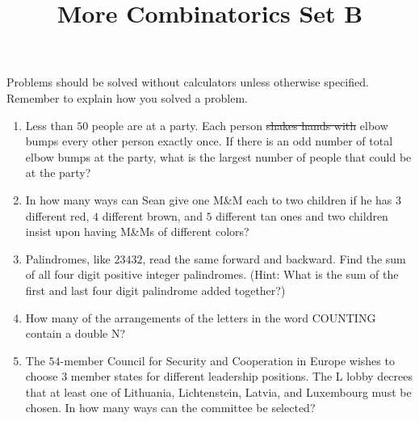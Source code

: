 \documentclass{article}
\title{More Combinatorics Set B}
\author{}
\date{}
\begin{document}
\maketitle
\noindent Problems should be solved without calculators unless otherwise 
specified. Remember to explain how you solved a problem.
\begin{enumerate}
    \item Less than $50$ people are at a party. Each person \sout{shakes hands 
        with} elbow bumps every other person exactly once. If there is an odd 
        number of total elbow bumps at the party, what is the largest number of 
        people that could be at the party?
        \vspace{3cm}
    \item In how many ways can Sean give one M\&M each to two children if he has 
        $3$ different red, $4$ different brown, and $5$ different tan ones and 
        two children insist upon having M\&Ms of different colors?
        \vspace{3cm}
    \item Palindromes, like $23432$, read the same forward and backward. Find 
        the sum of all four digit positive integer palindromes. (Hint: What is 
        the sum of the first and last four digit palindrome added together?)
        \vspace{3cm}
    \item How many of the arrangements of the letters in the word COUNTING 
        contain a double N?
        \vspace{3cm}
    \item The $54$-member Council for Security and Cooperation in Europe wishes 
        to choose $3$ member states for different leadership positions. The L 
        lobby decrees that at least one of Lithuania, Lichtenstein, Latvia, and 
        Luxembourg must be chosen. In how many ways can the committee be 
        selected?
        \vspace{3cm}
\end{enumerate}
\end{document}
